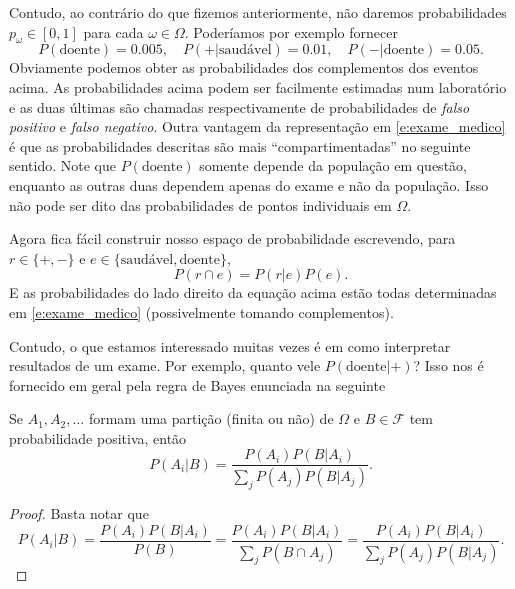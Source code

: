 Contudo, ao contrário do que fizemos anteriormente, não daremos probabilidades $p_\omega \in [0,1]$ para cada $\omega \in \Omega$.
Poderíamos por exemplo fornecer
\begin{equation}
  \label{e:exame_medico}
  P(\text{doente}) = 0.005, \quad P( + | \text{saudável}) = 0.01, \quad P( - | \text{doente}) = 0.05.
\end{equation}
Obviamente podemos obter as probabilidades dos complementos dos eventos acima.
As probabilidades acima podem ser facilmente estimadas num laboratório e as duas últimas são chamadas respectivamente de probabilidades de \emph{falso positivo} e \emph{falso negativo}.
Outra vantagem da representação em \eqref{e:exame_medico} é que as probabilidades descritas são mais ``compartimentadas'' no seguinte sentido.
Note que $P(\text{doente})$ somente depende da população em questão, enquanto as outras duas dependem apenas do exame e não da população.
Isso não pode ser dito das probabilidades de pontos individuais em $\Omega$.

Agora fica fácil construir nosso espaço de probabilidade escrevendo, para $r \in \{+, -\}$ e $e \in \{\text{saudável}, \text{doente}\}$,
\begin{equation}
  P(r \cap e) = P(r | e) P(e).
\end{equation}
E as probabilidades do lado direito da equação acima estão todas determinadas em \eqref{e:exame_medico} (possivelmente tomando complementos).

Contudo, o que estamos interessado muitas vezes é em como interpretar resultados de um exame.
Por exemplo, quanto vele $P(\text{doente} | +)$?
Isso nos é fornecido em geral pela regra de Bayes enunciada na seguinte

\begin{proposition}
  Se $A_1, A_2, \dots$ formam uma partição (finita ou não) de $\Omega$ e $B \in \mathcal{F}$ tem probabilidade positiva, então
  \begin{equation}
    P(A_i | B) = \frac{P(A_i) P(B | A_i)}{\sum_j P(A_j) P(B | A_j)}.
  \end{equation}
\end{proposition}

\begin{proof}
  Basta notar que
  \begin{equation}
    P(A_i | B) = \frac{P(A_i) P(B | A_i)}{P(B)} = \frac{P(A_i) P(B | A_i)}{\sum_j P(B \cap A_j)} = \frac{P(A_i) P(B | A_i)}{\sum_j P(A_j) P(B | A_j)}.
  \end{equation}
\end{proof}

